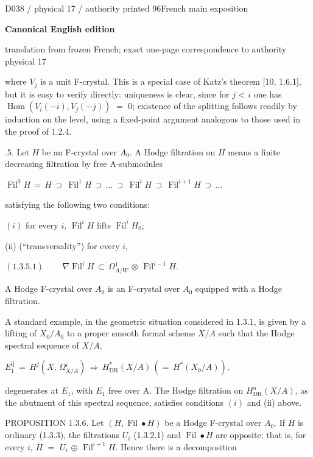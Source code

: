 \documentclass[9pt]{article}
\newcommand{\CanonText}[1]{\par{\fontsize{8.0}{9.35}\selectfont\RaggedRight #1\par}\vspace{2.2pt}}
\newcommand{\CanonDisplay}[1]{\par\vspace{1.2pt}\begin{center}{\fontsize{7.2}{8.4}\selectfont\(\displaystyle #1\)}\end{center}\vspace{1.2pt}}
\newcommand{\LayerTitle}{Canonical English edition}
\begin{document}
\noindent\begin{minipage}[t][\dimexpr\textheight-5pt\relax][t]{\textwidth}
{\sffamily\fontsize{7.3}{8.2}\selectfont\color{Quiet} D038 / physical 17 / authority printed 96\hfill French main exposition}
\par{}\vspace{4.5pt}
{\sffamily\fontsize{10.4}{11.6}\selectfont\bfseries\color{Accent} \LayerTitle}
\par{\sffamily\fontsize{6.7}{7.7}\selectfont\color{Quiet} translation from frozen French; exact one-page correspondence to authority physical 17}
\vspace{5pt}
\CanonText{where \(V_{j}\) is a unit F-crystal. This is a special case of Katz's theorem [10, 1.6.1], but it is easy to verify directly: uniqueness is clear, since for \(j\) < \(i\) one has \(\operatorname{Hom}(V_{i}(-i),V_{j}(-j))\) \(=\) 0; existence of the splitting follows readily by induction on the level, using a fixed-point argument analogous to those used in the proof of 1.2.4.}
\CanonText{1.3.5. Let \(H\) be an F-crystal over \(A_{0}\). A Hodge filtration on \(H\) means a finite decreasing filtration by free A-submodules}
\CanonDisplay{\operatorname{Fil}^{0}H\,=\,H\,\supset{}\,\operatorname{Fil}^{1}H\,\supset{}\,\ldots{}\,\supset{}\,\operatorname{Fil}^{i}H\,\supset{}\,\operatorname{Fil}^{i+1}H\,\supset{}\,\ldots{}}
\CanonText{satisfying the following two conditions:}
\CanonText{\((i)\) for every \(i\), \(\operatorname{Fil}^{i}H\) lifts \(\operatorname{Fil}^{i}H_{0}\);}
\CanonText{(ii) (“transversality”) for every \(i\),}
\CanonDisplay{(1.3.5.1)\qquad\,\nabla{}\operatorname{Fil}^{i}H\,\subset{}\,\Omega{}^{1}_{A/W}\,\otimes{}\,\operatorname{Fil}^{i-1}H.}
\CanonText{A Hodge F-crystal over \(A_{0}\) is an F-crystal over \(A_{0}\) equipped with a Hodge filtration.}
\CanonText{A standard example, in the geometric situation considered in 1.3.1, is given by a lifting of \(X_{0}/A_{0}\) to a proper smooth formal scheme \(X/A\) such that the Hodge spectral sequence of \(X/A\),}
\CanonDisplay{E_{1}^{\mathrm{ij}}\,=\,H^{j}(X,\,\Omega{}^{i}_{X/A})\,\Rightarrow{}\,H^{*}_{\mathrm{DR}}(X/A)\,(=\,H^{*}(X_{0}/A)),}
\CanonText{degenerates at \(E_{1}\), with \(E_{1}\) free over A. The Hodge filtration on \(H^{n}_{\mathrm{DR}}(X/A)\), as the abutment of this spectral sequence, satisfies conditions \((i)\) and (ii) above.}
\CanonText{PROPOSITION 1.3.6. Let \((H,\operatorname{Fil}\bullet{}H)\) be a Hodge F-crystal over \(A_{0}\). If \(H\) is ordinary (1.3.3), the filtrations \(U_{i}\) (1.3.2.1) and \(\operatorname{Fil}\bullet{}H\) are opposite; that is, for every \(i\), \(H\) \(=\) \(U_{i}\) \(\oplus{}\) \(\operatorname{Fil}^{i+1}H\). Hence there is a decomposition}

\end{minipage}
\end{document}
